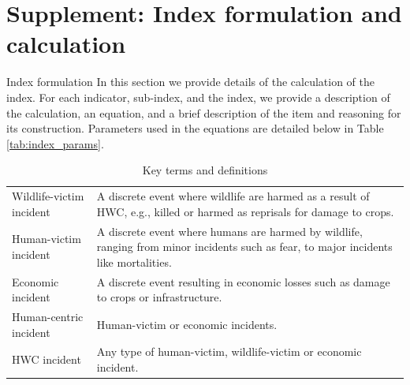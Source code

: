 \documentclass[fleqn,10pt]{olplainarticle}
\begin{document}

%        
%

\clearpage
\appendix
\renewcommand\thefigure{S\arabic{figure}}
\renewcommand\thetable{S\arabic{table}}
\renewcommand\theequation{S\arabic{equation}}
\setcounter{figure}{0}
\setcounter{table}{0}

\section*{Supplement: Index formulation and calculation}
\label{S1}
Index formulation
In this section we provide details of the calculation of the index. For each indicator, sub-index, and the index, we provide a description of the calculation, an equation, and a brief description of the item and reasoning for its construction. Parameters used in the equations are detailed below in Table \ref{tab:index_params}.


\begin{table}[ht!]
    \centering
    \caption{Key terms and definitions}
    \label{tab:definitions}
    \begin{tabular}{
    >{\raggedright\arraybackslash}p{3.5cm}
    p{10cm}
    }
         Wildlife-victim incident & A discrete event where wildlife are harmed as a result of HWC, e.g., killed or harmed as reprisals for damage to crops.\\
         Human-victim incident & A discrete event where humans are harmed by wildlife, ranging from minor incidents such as fear, to major incidents like mortalities.\\
         Economic incident & A discrete event resulting in economic losses such as damage to crops or infrastructure.\\
         Human-centric incident & Human-victim or economic incidents.\\
         HWC incident & Any type of human-victim, wildlife-victim or economic incident.\\
         
    \end{tabular}
\end{table}
\end{document}
